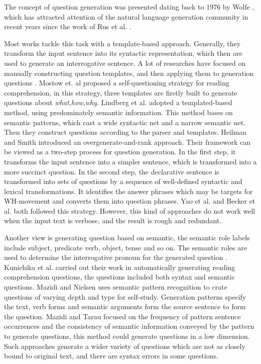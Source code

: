 \documentclass[runningheads,UTF8,article]{comsis2}
\newcommand\revised[1]{{\color{black} #1}}
\begin{document}
	
	The concept of question generation was presented dating back to 1976 by Wolfe \cite{wolfe},	which has attracted attention of the natural language generation community in recent years since the work of Rus et al. \cite{rus2010first}.
	
	
	Most works tackle this task with a template-based approach. Generally, they transform the input sentence into its syntactic representation, which then are used to generate an interrogative sentence. A lot of researches have focused on manually constructing question templates, and then applying them to generation questions \cite{mostow2009generating,lindberg2013generating,heilman2010good}. 
	Mostow et. al \cite{mostow2009generating} proposed a self-questioning strategy for \revised{reading comprehension}, in this strategy, three templates are firstly built to generate questions about \emph{what,how,why}. Lindberg et al.\cite{lindberg2013generating} adopted a templated-based method, using predominately semantic information.
	This method bases on semantic patterns, which cast a wide syntactic net and a narrow semantic net. Then they construct questions according to the parser and templates. Heilman and Smith \cite{heilman2010good} introduced an overgenerate-and-rank approach. \revised{Their framework can be viewed as a two-step process for question generation.  In the first step, it transforms the input sentence into a simpler sentence, which is transformed into a more succinct question. In the second step, the declarative sentence is transformed into sets of questions by a sequence of well-defined syntactic and lexical transformations. It identifies the answer phrases which may be targets for WH-movement and converts them into question phrases}. Yao et al. \cite{yao} and Becker et al.\cite{becker} both followed this strategy. However, this kind of approaches do not work well when the input text is verbose, and the result is rough and redundant.
	
	
	
	Another view is generating question based on semantic, the semantic role labels include subject, predicate verb, object, tense and so on. The semantic roles are used to determine the interrogative pronoun for the generated question \cite{Kunichika2001AutomatedQG,infusing,mazidi2014linguistic}. Kunichika et al. \cite{Kunichika2001AutomatedQG} carried out their work in automatically generating reading comprehension questions, the questions included both syntax and semantic questions.
	Mazidi and Nielsen \cite{mazidi2014linguistic} uses semantic pattern recognition to crate questions of varying depth and type for self-study. Generation patterns specify the text, verb forms and semantic arguments form the source sentence to form the question. Mazidi and Tarau \cite{infusing} focused on the frequency of pattern sentence occurrences and the consistency of semantic information conveyed by the pattern to generate questions, this method could generate questions in a low dimension. Such approaches generate a wider variety of questions which are not as closely bound to original text, and there are syntax errors in some questions.
	
\end{document}
